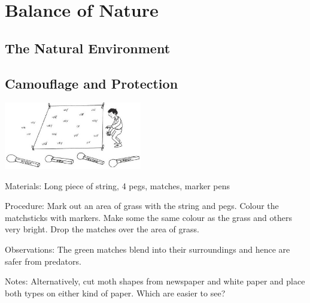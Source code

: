 \section{Balance of Nature}

\begin{multicols}{2}



\section*{The Natural Environment}


\subsection{Camouflage and Protection} %

\begin{center}
\includegraphics[width=0.45\textwidth]{./img/vso/camouflage-protection.jpg}
\end{center}

\begin{description*}
\item[Materials:]{Long piece of string, 4 pegs, matches, marker pens}
\item[Procedure:]{Mark out an area of grass with
the string and pegs. Colour the
matchsticks with markers. Make some the same
colour as the grass and others
very bright. Drop the
matches over the area of grass.
}
\item[Observations:]{The green matches blend into their surroundings and hence are safer from predators.}
\item[Notes:]{Alternatively, cut moth shapes from newspaper
and white paper and place both types on either kind of paper. Which are easier to see?}
\end{description*}


\end{multicols}
